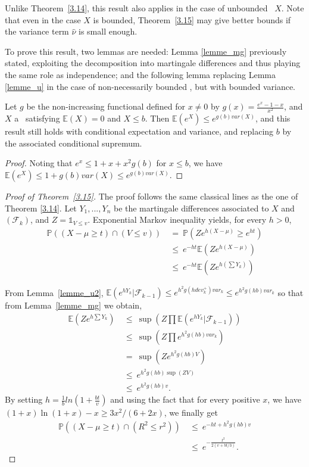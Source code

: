 Unlike Theorem~\ref{3.14}, this result also applies in the case of unbounded \rv~$X$. Note that even in the case $X$ is bounded, Theorem~\ref{3.15} may give better bounds if the variance term $\hat\nu$ is small enough. 

To prove this result, two lemmas are needed: Lemma \ref{lemme_mg} previously stated, exploiting the decomposition into martingale differences and thus playing the same role as independence; and the following lemma replacing Lemma \ref{lemme_u} in the case of non-necessarily bounded \rv, but with bounded variance.
\begin{lemma}
\label{lemme_u2}
Let $g$ be the non-increasing functional defined for $x \neq 0$ by $g(x)=\frac{e^x-1-x}{x^2}$, and $X$ a \rv~satisfying $\mathbb{E}(X)=0$ and $X \leq b$.
Then $\mathbb{E}(e^X) \leq e^{g(b)var(X)}$, and this result still holds with conditional expectation and variance, and replacing $b$ by the associated conditional supremum.%
\end{lemma}
\begin{proof}
Noting that $e^x \leq 1+x+x^2g(b)$ for $x \leq b$, we have $\mathbb{E}(e^X) \le 1 + g(b) var(X) \le e^{g(b) var(X)}$.
\end{proof}

\begin{proof}[Proof of Theorem~\ref{3.15}]
The proof follows the same classical lines as the one of Theorem \ref{3.14}.
Let $Y_1,...,Y_n$ be the martingale differences associated to $X$ and $(\mathcal{F}_k)$, and
$Z=\mathds{1}_{V \leq v}$. Exponential Markov inequality yields, for every $h > 0$,
 \begin{align*}
\mathbb{P}((X-\mu \geq t)\cap(V \leq v)) 
 &~=~ \mathbb{P}(Ze^{h(X-\mu)} \geq e^{ht})\\
 &~\leq~ e^{-ht}\mathbb{E}(Ze^{h(X-\mu)})\\
 &~\leq~ e^{-ht}\mathbb{E}(Ze^{h(\sum Y_k)}) 
 \end{align*}

From Lemma~\ref{lemme_u2}, 
$\mathbb{E}(e^{hY_k}|\mathcal{F}_{k-1}) \leq e^{h^2g(hdev_k^+)var_k} \leq e^{h^2g(hb)var_k}$ so that
from Lemma~\ref{lemme_mg} we obtain,
\begin{align*}
 \mathbb{E}(Ze^{h\sum Y_k}) &~\leq~ \sup(Z \prod \mathbb{E}(e^{hY_k}|\mathcal{F}_{k-1}))\\
& ~\leq~ \sup(Z \prod e^{h^2g(hb)var_k})\\
&~=~  \sup(Z e^{h^2g(hb)V})\\
&~\leq~ e^{h^2g(hb)\sup(ZV)}\\
&~\leq~ e^{h^2g(hb)v}.
\end{align*}
By setting $h=\frac{1}{b}ln(1+\frac{bt}{v})$ and using the fact that for every positive $x$, we have $(1+x)\ln(1+x)-x \geq 3x^2/(6+2x)$, we finally get
\begin{align*} \mathbb{P}((X-\mu \geq t)\cap(R^2 \leq r^2)) &~\leq~ e^{-ht+h^2g(hb)v}\\
&~\leq~ e^{-\frac{t^2}{2(v+bt/3)}}.
\end{align*}


\end{proof}


